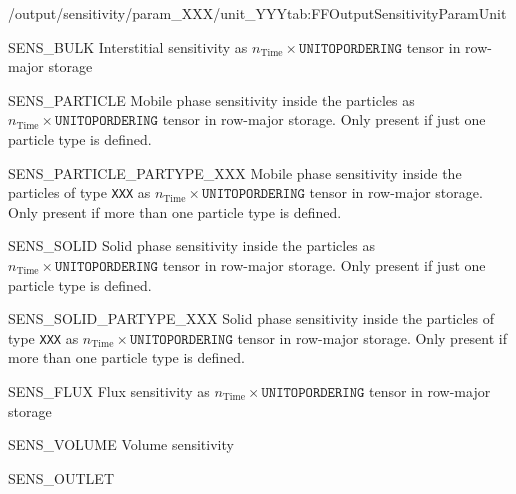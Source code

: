 \begin{groupscope}{/output/sensitivity/param\_XXX/unit\_YYY}{tab:FFOutputSensitivityParamUnit}
  \begin{dataset}[type=double,unit={\si{\mol\per\cubic\metre\of{IV}\per\ParamUnit}}]{SENS\_BULK}
    Interstitial sensitivity as $n_{\text{Time}} \times \texttt{UNITOPORDERING}$ tensor in row-major storage
  \end{dataset}
  \begin{dataset}[type=double,unit={\si{\mol\per\cubic\metre\of{MP}\per\ParamUnit}}]{SENS\_PARTICLE}
    Mobile phase sensitivity inside the particles as $n_{\text{Time}} \times \texttt{UNITOPORDERING}$ tensor in row-major storage.
    Only present if just one particle type is defined.
  \end{dataset}
  \begin{dataset}[type=double,unit={\si{\mol\per\cubic\metre\of{MP}\per\ParamUnit}}]{SENS\_PARTICLE\_PARTYPE\_XXX}
    Mobile phase sensitivity inside the particles of type \texttt{XXX} as $n_{\text{Time}} \times \texttt{UNITOPORDERING}$ tensor in row-major storage.
    Only present if more than one particle type is defined.
  \end{dataset}
  \begin{dataset}[type=double,unit={\si{\mol\per\cubic\metre\of{MP}\per\ParamUnit}}]{SENS\_SOLID}
    Solid phase sensitivity inside the particles as $n_{\text{Time}} \times \texttt{UNITOPORDERING}$ tensor in row-major storage.
    Only present if just one particle type is defined.
  \end{dataset}
  \begin{dataset}[type=double,unit={\si{\mol\per\cubic\metre\of{SP}\per\ParamUnit}}]{SENS\_SOLID\_PARTYPE\_XXX}
    Solid phase sensitivity inside the particles of type \texttt{XXX} as $n_{\text{Time}} \times \texttt{UNITOPORDERING}$ tensor in row-major storage.
    Only present if more than one particle type is defined.
  \end{dataset}
  \begin{dataset}[type=double,unit={\si{\mol\per\square\metre\per\second\per\ParamUnit}}]{SENS\_FLUX}
    Flux sensitivity as $n_{\text{Time}} \times \texttt{UNITOPORDERING}$ tensor in row-major storage
  \end{dataset}
  \begin{dataset}[type=double,unit={\si{\cubic\metre\per\ParamUnit}}]{SENS\_VOLUME}
    Volume sensitivity
  \end{dataset}
  \begin{dataset}[type=double,unit={\si{\mol\per\cubic\metre\of{IV}\per\ParamUnit}}]{SENS\_OUTLET}

\end{dataset}
\end{groupscope}
